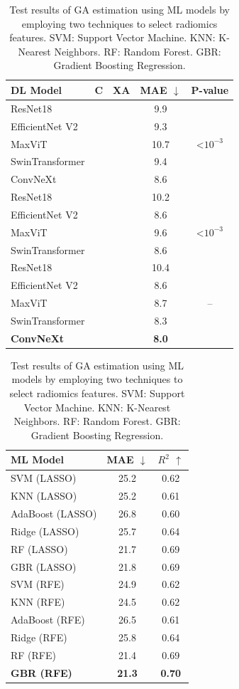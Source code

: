 \documentclass[final,british,a4paper,12pt]{phdthesis}
\newcommand{\cmark}{\ding{51}}%
\newcommand{\xmark}{\ding{55}}%
\begin{document}
\begin{table}[tb]
\parbox{.51\linewidth}{
\centering
\caption{Test results of GA estimation by integrating DL models with concatenation and cross-attention mechanisms are compared. C: Concatenation. XA: Cross-attention.}\label{test_results}
\setlength{\tabcolsep}{2.8pt}
\begin{tabular}{lcc|c|c}
\hline
DL Model & C & XA & MAE $\downarrow$ & P-value\\
\hline
ResNet18 & \xmark & \xmark & 9.9 & \\
EfficientNet V2 & \xmark & \xmark & 9.3 & \multirow{3}{*}{<$10^{-3}$ } \\ %
MaxViT & \xmark & \xmark & 10.7 & \\
SwinTransformer & \xmark & \xmark & 9.4 & \\
ConvNeXt & \xmark & \xmark & 8.6 & \\
\hline
ResNet18 & \cmark & \xmark & 10.2 & \\
EfficientNet V2 & \cmark & \xmark & 8.6 & \multirow{3}{*}{<$10^{-3}$ } \\
MaxViT & \cmark & \xmark & 9.6 & \\
SwinTransformer & \cmark & \xmark & 8.6 & \\
\hline
ResNet18 & \xmark & \cmark & 10.4 & \multirow{5}{*}{--} \\
EfficientNet V2 & \xmark & \cmark & 8.6 & \\
MaxViT & \xmark & \cmark & 8.7 & \\
SwinTransformer & \xmark & \cmark & 8.3 & \\
\textbf{ConvNeXt} & \xmark & \cmark & \textbf{8.0} & \\
\hline
\end{tabular}
}
\hfill
\parbox{.46\linewidth}{
\centering
\caption{Test results of GA estimation using ML models by employing two techniques to select radiomics features. SVM: Support Vector Machine. KNN: K-Nearest Neighbors. RF: Random Forest. GBR: Gradient Boosting Regression.}\label{ml_models}

\setlength{\tabcolsep}{5pt}
\begin{tabular}{l|c|c}
\hline
ML Model & MAE $\downarrow$ & $R^2$ $\uparrow$ \\
\hline
SVM (LASSO) & 25.2 & 0.62 \\ 
KNN (LASSO) & 25.2 & 0.61 \\ 
AdaBoost (LASSO) & 26.8 & 0.60 \\ 
Ridge (LASSO) & 25.7 & 0.64 \\ 
RF (LASSO) & 21.7 & 0.69 \\
GBR (LASSO) & 21.8 & 0.69 \\
\hline
SVM (RFE) & 24.9 & 0.62 \\ 
KNN (RFE) & 24.5 & 0.62 \\ 
AdaBoost (RFE) & 26.5 & 0.61 \\ 
Ridge (RFE) & 25.8 & 0.64 \\ 
RF (RFE) & 21.4 & 0.69 \\
\textbf{GBR (RFE)} & \textbf{21.3} & \textbf{0.70} \\
\hline
\end{tabular}
}
\end{table}
\end{document}
